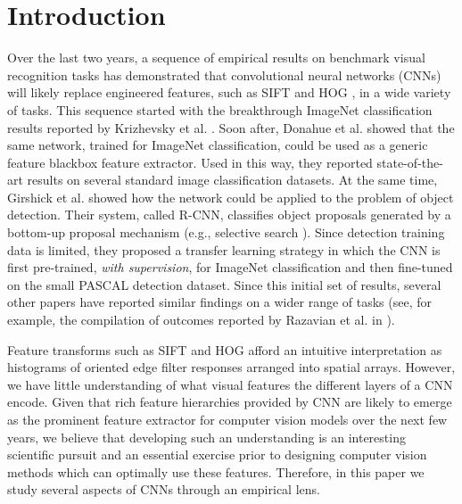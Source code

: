 \section{Introduction}

Over the last two years, a sequence of empirical results on benchmark visual recognition tasks has demonstrated that convolutional neural networks (CNNs) \cite{fukushima1980neocognitron,Lecun89,rumelhart86} will likely replace engineered features, such as SIFT \cite{Sift} and HOG \cite{Hog}, in a wide variety of tasks.
This sequence started with the breakthrough ImageNet classification results reported by Krizhevsky et al. \cite{Kriz}.
Soon after, Donahue et al. \cite{Decaf} showed that the same network, trained for ImageNet classification, could be used as a generic feature blackbox feature extractor.
Used in this way, they reported state-of-the-art results on several standard image classification datasets.
At the same time, Girshick et al. \cite{Rcnn} showed how the network could be applied to the problem of object detection.
Their system, called R-CNN, classifies object proposals generated by a bottom-up proposal mechanism (e.g., selective search \cite{UijlingsIJCV2013}).
Since detection training data is limited, they proposed a transfer learning strategy in which the CNN is first pre-trained, \emph{with supervision}, for ImageNet classification and then fine-tuned on the small PASCAL detection dataset.
Since this initial set of results, several other papers have reported similar findings on a wider range of tasks (see, for example, the compilation of outcomes reported by Razavian et al. in \cite{astounding}).

Feature transforms such as SIFT and HOG afford an intuitive interpretation as histograms of oriented edge filter responses arranged into spatial arrays.
However, we have little understanding of what visual features the different layers of a CNN encode.
Given that rich feature hierarchies provided by CNN are likely to emerge as the prominent feature extractor for computer vision models over the next few years, we believe that developing such an understanding is an interesting scientific pursuit and an essential exercise prior to designing computer vision methods which can optimally use these features.
Therefore, in this paper we study several aspects of CNNs through an empirical lens.

